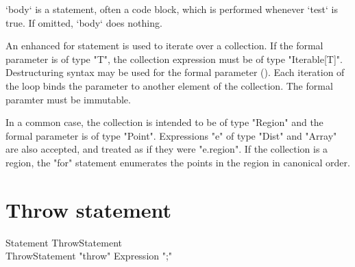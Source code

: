 \xcd`body` is a statement, often a code block, which is performed whenever
\xcd`test` is true.  If omitted, \xcd`body` does nothing.




\label{ForAllLoop}


An enhanced for statement is used to iterate over a collection.
If the formal parameter is of type \xcd"T",
the collection expression must be of type \xcd"Iterable[T]".
Destructuring
syntax may
be used for the formal parameter ().
Each iteration of the loop
binds the parameter to another element of the collection.
The formal paramter must be immutable. 

In a common case, 
the collection is intended to be of type
\xcd"Region" and the formal parameter is of type \xcd"Point".
Expressions \xcd"e" of type \xcd"Dist" and
\xcd"Array" are also accepted, and treated as if they were
\xcd"e.region".
If the collection is a region, the \xcd"for" statement
enumerates the points in the region in canonical order.



\section{Throw statement}

\begin{grammar}
Statement \: ThrowStatement \\
ThrowStatement \: \xcd"throw" Expression \xcd";"
\end{grammar}

